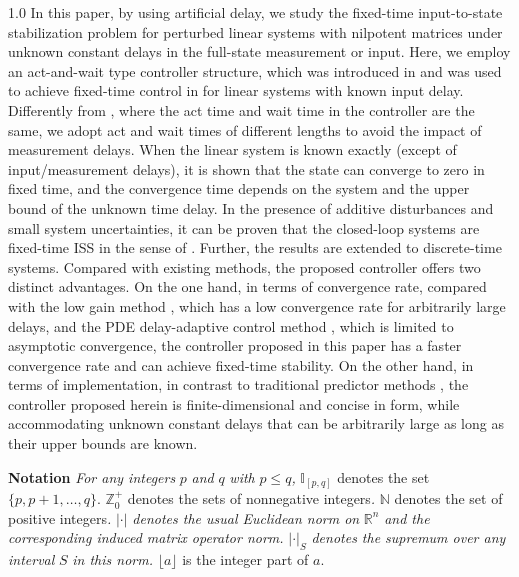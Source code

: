 \documentclass[journal]{IEEEtran}
\begin{document}
\begin{spacing}{1.0}
In this paper, by using artificial delay, we study the fixed-time
input-to-state stabilization problem for perturbed linear systems with
nilpotent matrices under unknown constant delays in the full-state measurement or input. Here, we employ
an act-and-wait type controller structure, which was introduced in
\cite{Insp06tcst} and was used to achieve fixed-time control in
\cite{Zhou21tac,Michiels20scl} for linear systems with known input delay. Differently from \cite{Zhou21tac,Michiels20scl}, where the act time and wait time in the controller are the same, we adopt act and wait times of different
lengths to avoid the impact of measurement delays. When the linear system is known
exactly (except of input/measurement delays), it is shown that the state can converge
to zero in fixed time, and the convergence time depends on the system and the upper bound of the unknown time delay. In the presence of additive disturbances and small system uncertainties, it can be proven that the closed-loop systems are fixed-time ISS in the
sense of \cite{Mazenc25tac}. Further, the results are extended to
discrete-time systems. Compared with existing methods, the proposed controller offers two distinct advantages. On the one hand, in terms of convergence rate, compared with the low gain method \cite{zhou09tac}, which has a low convergence rate for arbitrarily large delays, and the PDE delay-adaptive control method \cite{Zhu16tac}, which is limited to asymptotic convergence, the controller proposed in this paper has a faster convergence rate and can achieve fixed-time stability. On the other hand, in terms of implementation, in contrast to traditional predictor methods \cite{Krstic10tac,Zhu16tac}, the controller proposed herein is finite-dimensional and concise in form, while accommodating unknown constant delays that can be arbitrarily large as long as their upper bounds are known.


\textbf{Notation} \textit{For any integers }$p$\textit{ and }$q$\textit{ with
}$p\leq q$\textit{, }$\mathbb{I}_{[p,q]}$ denotes the set $\{p,p+1,\ldots
,q\}$. $%
\mathbb{Z}
_{0}^{+}$ denotes the sets of nonnegative integers\textit{. } \(\mathbb N\) denotes the set of positive integers\textit{. }$|\cdot|$\textit{
denotes the usual Euclidean norm on }$\mathbb{R}^{n}$\textit{ and the
corresponding induced matrix operator norm. }$|\cdot|_{S}$\textit{ denotes the
supremum over any interval }$S$\textit{ in this norm. }$\lfloor a\rfloor
$\textit{ }is the integer part of $a$.


\end{spacing}
\end{document}
